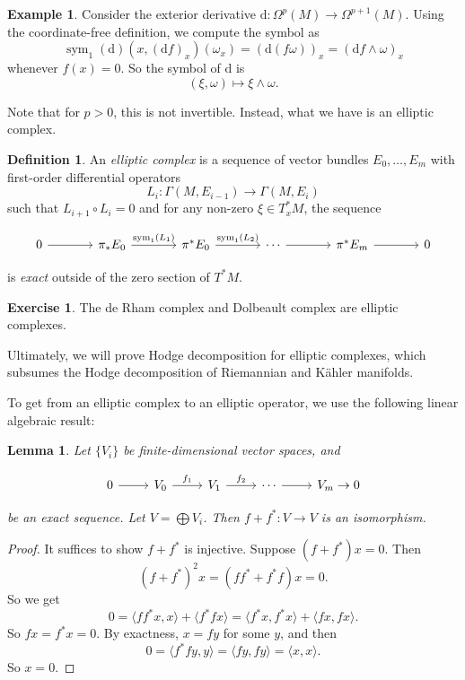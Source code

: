 \documentclass{shortart}
\newtheorem*{lemma}{Lemma}
\theoremstyle{definition}
\newtheorem*{defi}{Definition}
\newtheorem*{eg}{Example}
\newtheorem*{ex}{Exercise}
\newcommand\bra\langle
\newcommand\ket\rangle
\newcommand\der{\mathrm{d}}
\DeclareMathOperator\symb{sym}
\begin{document}
\begin{eg}
  Consider the exterior derivative $\der: \Omega^p(M) \to \Omega^{p + 1}(M)$. Using the coordinate-free definition, we compute the symbol as
  \[
    \symb_1(\der)(x, (\der f)_x)(\omega_x) = (\der (f\omega))_x = (\der f \wedge \omega)_x
  \]
  whenever $f(x) = 0$. So the symbol of $\der$ is
  \[
    (\xi, \omega) \mapsto \xi \wedge \omega.
  \]
\end{eg}
Note that for $p > 0$, this is not invertible. Instead, what we have is an elliptic complex.
\begin{defi}
  An \emph{elliptic complex} is a sequence of vector bundles $E_0, \ldots, E_m$ with first-order differential operators
  \[
    L_i: \Gamma(M, E_{i - 1}) \to \Gamma(M, E_i)
  \]
  such that $L_{i + 1} \circ L_i = 0$ and for any non-zero $\xi \in T^*_x M$, the sequence
  \begin{useimager}
    \[
      \begin{tikzcd}[column sep=large]
        0 \ar[r] & \pi_* E_0 \ar[r, "\symb_1(L_1)"] & \pi^* E_0 \ar[r, "\symb_1(L_2)"] & \cdots \ar[r] & \pi^* E_m \ar[r] & 0
      \end{tikzcd}
    \]
  \end{useimager}
  is \emph{exact} outside of the zero section of $T^*M$.
\end{defi}
\begin{ex}
  The de Rham complex and Dolbeault complex are elliptic complexes.
\end{ex}
Ultimately, we will prove Hodge decomposition for elliptic complexes, which subsumes the Hodge decomposition of Riemannian and K\"ahler manifolds.

To get from an elliptic complex to an elliptic operator, we use the following linear algebraic result:
\begin{lemma}
  Let $\{V_i\}$ be finite-dimensional vector spaces, and 
  \begin{useimager}
    \[
      \begin{tikzcd}
        0 \ar[r] & V_0 \ar[r, "f_1"] & V_1 \ar[r, "f_2"] & \cdots \ar[r] & V_m \to 0
      \end{tikzcd}
    \]
  \end{useimager}
  be an exact sequence. Let $V = \bigoplus V_i$. Then $f + f^*: V \to V$ is an isomorphism.
\end{lemma}

\begin{proof}
  It suffices to show $f + f^*$ is injective. Suppose $(f + f^*)x = 0$. Then
  \[
    (f + f^*)^2 x = (ff^* + f^* f)x = 0.
  \]
  So we get
  \[
    0 = \bra ff^*x, x\ket + \bra f^*fx\ket = \bra f^* x, f^* x\ket + \bra fx, fx\ket.
  \]
  So $fx = f^*x = 0$. By exactness, $x = fy$ for some $y$, and then
  \[
    0 = \bra f^* fy, y\ket = \bra fy, fy\ket = \bra x, x \ket.
  \]
  So $x = 0$.
\end{proof}
\end{document}
